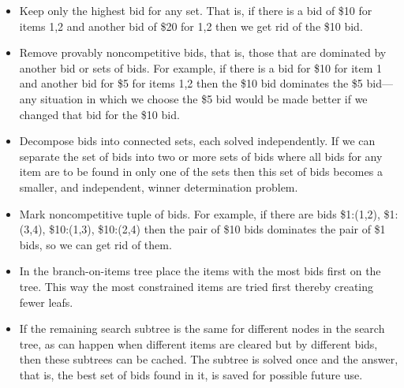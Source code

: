 \begin{itemize}
\item Keep only the highest bid for any set. That is, if there is a
  bid of \$10 for items 1,2 and another bid of \$20 for 1,2 then we
  get rid of the \$10 bid.

\item Remove provably noncompetitive bids, that is, those that are
  dominated by another bid or sets of bids. For example, if there is
  a bid for \$10 for item 1 and another bid for \$5 for items 1,2 then
  the \$10 bid dominates the \$5 bid---any situation in which we
  choose the \$5 bid would be made better if we changed that bid for
  the \$10 bid.

\item Decompose bids into connected sets, each solved independently.
  If we can separate the set of bids into two or more sets of bids
  where all bids for any item are to be found in only one of the sets
  then this set of bids becomes a smaller, and independent, winner
  determination problem.
    
\item Mark noncompetitive tuple of bids. For example, if there are
  bids \$1:(1,2), \$1:(3,4), \$10:(1,3), \$10:(2,4) then the pair of
  \$10 bids dominates the pair of \$1 bids, so we can get rid of them.

\item In the branch-on-items tree place the items with the most bids
  first on the tree. This way the most constrained items are tried
  first thereby creating fewer leafs.

\item If the remaining search subtree is the same for different nodes in
  the search tree, as can happen when different items are cleared but
  by different bids, then these subtrees can be cached. The subtree is
  solved once and the answer, that is, the best set of bids found in
  it, is saved for possible future use.

\end{itemize}

